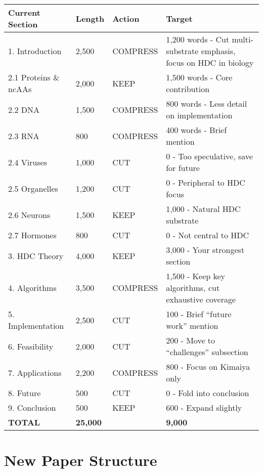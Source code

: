\documentclass[11pt]{article}
\begin{document}
\begin{center}
\begin{tabular}{|p{4cm}|p{2cm}|p{1.5cm}|p{5cm}|}
\hline
\textbf{Current Section} & \textbf{Length} & \textbf{Action} & \textbf{Target} \\
\hline
1. Introduction & 2,500 & \textcolor{compress}{COMPRESS} & 1,200 words - Cut multi-substrate emphasis, focus on HDC in biology \\
\hline
2.1 Proteins \& ncAAs & 2,000 & \textcolor{keep}{KEEP} & 1,500 words - Core contribution \\
\hline
2.2 DNA & 1,500 & \textcolor{compress}{COMPRESS} & 800 words - Less detail on implementation \\
\hline
2.3 RNA & 800 & \textcolor{compress}{COMPRESS} & 400 words - Brief mention \\
\hline
2.4 Viruses & 1,000 & \textcolor{cut}{CUT} & 0 - Too speculative, save for future \\
\hline
2.5 Organelles & 1,200 & \textcolor{cut}{CUT} & 0 - Peripheral to HDC focus \\
\hline
2.6 Neurons & 1,500 & \textcolor{keep}{KEEP} & 1,000 - Natural HDC substrate \\
\hline
2.7 Hormones & 800 & \textcolor{cut}{CUT} & 0 - Not central to HDC \\
\hline
3. HDC Theory & 4,000 & \textcolor{keep}{KEEP} & 3,000 - Your strongest section \\
\hline
4. Algorithms & 3,500 & \textcolor{compress}{COMPRESS} & 1,500 - Keep key algorithms, cut exhaustive coverage \\
\hline
5. Implementation & 2,500 & \textcolor{cut}{CUT} & 100 - Brief ``future work'' mention \\
\hline
6. Feasibility & 2,000 & \textcolor{cut}{CUT} & 200 - Move to ``challenges'' subsection \\
\hline
7. Applications & 2,200 & \textcolor{compress}{COMPRESS} & 800 - Focus on Kimaiya only \\
\hline
8. Future & 500 & \textcolor{cut}{CUT} & 0 - Fold into conclusion \\
\hline
9. Conclusion & 500 & \textcolor{keep}{KEEP} & 600 - Expand slightly \\
\hline
\textbf{TOTAL} & \textbf{25,000} &  & \textbf{9,000} \\
\hline
\end{tabular}
\end{center}

\section{New Paper Structure}
\end{document}
